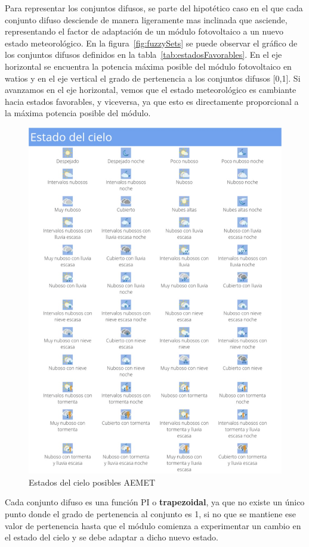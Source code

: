 Para representar los conjuntos difusos, se parte del hipotético caso en el que cada conjunto difuso desciende de manera ligeramente mas inclinada que asciende, representando el factor de adaptación de un módulo fotovoltaico a un nuevo estado meteorológico. En la figura~\ref{fig:fuzzySets} se puede observar el gráfico de los conjuntos difusos definidos en la tabla~\ref{tab:estadosFavorables}. En el eje horizontal se encuentra la potencia máxima posible del módulo fotovoltaico en watios y en el eje vertical el grado de pertenencia a los conjuntos difusos [0,1]. Si avanzamos en el eje horizontal, vemos que el estado meteorológico es cambiante hacia estados favorables, y viceversa, ya que esto es directamente proporcional a la máxima potencia posible del módulo.
\begin{figure}[!h]
	\centering
	\includegraphics[width=17cm]{figs/estadoCieloAEMET.png}
	\caption{Estados del cielo posibles AEMET}
	\label{fig:estadoCielo}
\end{figure}
Cada conjunto difuso es una función PI o \textbf{trapezoidal}, ya que no existe un único punto donde el grado de pertenencia al conjunto es 1, si no que se mantiene ese valor de pertenencia hasta que el módulo comienza a experimentar un cambio en el estado del cielo y se debe adaptar a dicho nuevo estado.

